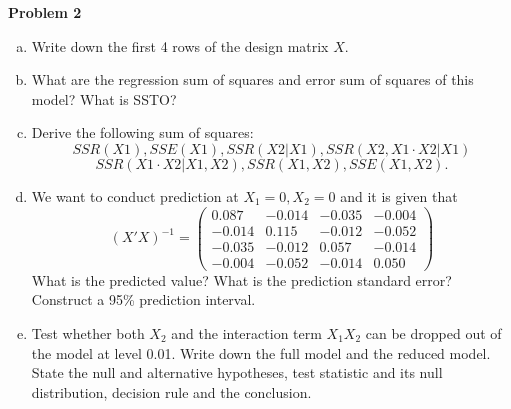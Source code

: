 \documentclass{article}
\newenvironment{problem}[2][Problem]
    { \begin{mdframed}[backgroundcolor=gray!20] \textbf{#1 #2} \\}
    {  \end{mdframed}}
\begin{document}
\begin{problem}{2}
\begin{enumerate}[(a)]
\item Write down the first 4 rows of the design matrix $X$.
\item What are the regression sum of squares and error sum of squares of this model?
What is SSTO?
\item Derive the following sum of squares:
$$SSR(X1), SSE(X1), SSR(X2 | X1), SSR(X2, X1 \cdot X2 | X1)$$
$$SSR(X1 \cdot X2 | X1, X2), SSR(X1, X2), SSE(X1, X2).$$
\item We want to conduct prediction at $X_1 = 0, X_2 = 0$ and it is given that
$$(X'X)^{-1}  = \begin{pmatrix}
0.087 & -0.014 &-0.035 & -0.004 \\
-0.014 & 0.115 & -0.012 & -0.052 \\
-0.035 & -0.012 & 0.057 & -0.014 \\
- 0.004 & -0.052 & -0.014 & 0.050
\end{pmatrix}$$
What is the predicted value? What is the prediction standard error? Construct a
95\% prediction interval.
\item Test whether both $X_2$ and the interaction term $X_1X_2$ can be dropped out of the model at level 0.01. Write down the full model and the reduced model. State the null and alternative hypotheses, test statistic and its null distribution, decision rule and the conclusion.
\end{enumerate}

\end{problem}
\end{document}
